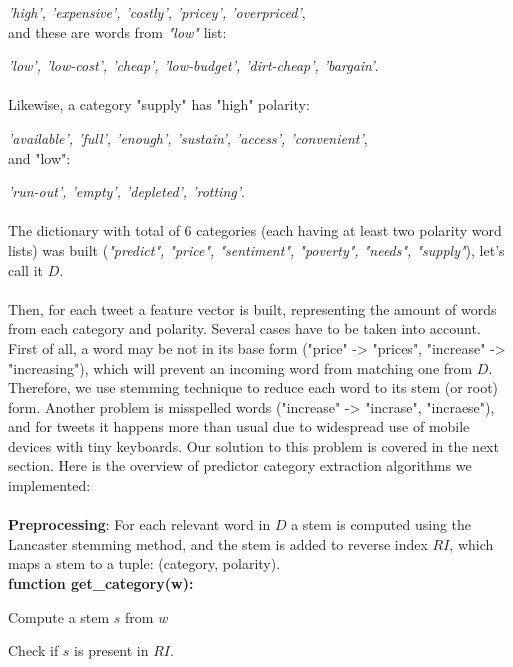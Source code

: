\emph{'high', 'expensive', 'costly', 'pricey', 'overpriced'},
\\
and these are words from \emph{"low"} list:

\emph{'low', 'low-cost', 'cheap', 'low-budget', 'dirt-cheap', 'bargain'}.
\\ \\
Likewise, a category "supply" has "high" polarity:

\emph{'available', 'full', 'enough', 'sustain', 'access', 'convenient'},
\\
and "low":

\emph{'run-out', 'empty', 'depleted', 'rotting'}.
\\ \\
The dictionary with total of 6 categories (each having at least two polarity word lists) was built (\emph{"predict", "price", "sentiment", "poverty", "needs", "supply"}), let's call it $D$.
\\ \\
Then, for each tweet a feature vector is built, representing the amount of words from each category and polarity. Several cases have to be taken into account. First of all, a word may be not in its base form ("price" -> "prices", "increase" -> "increasing"), which will prevent an incoming word from matching one from $D$. Therefore, we use stemming technique to reduce each word to its stem (or root) form. Another problem is misspelled words ("increase" -> "incrase", "incraese"), and for tweets it happens more than usual due to widespread use of mobile devices with tiny keyboards. Our solution to this problem is covered in the next section.
\newpage
Here is the overview of predictor category extraction algorithms we implemented:\\ \\
\textbf{Preprocessing}: For each relevant word in $D$ a stem is computed using the Lancaster stemming method, and the stem is added to reverse index $RI$, which maps a stem to a tuple: (category, polarity). \\

\textbf{function get\_category(w):}

\indent
\begin{algorithm}[H]
Compute a stem $s$ from $w$ \par
Check if $s$ is present in $RI$.

\end{algorithm}
\noindent \\

